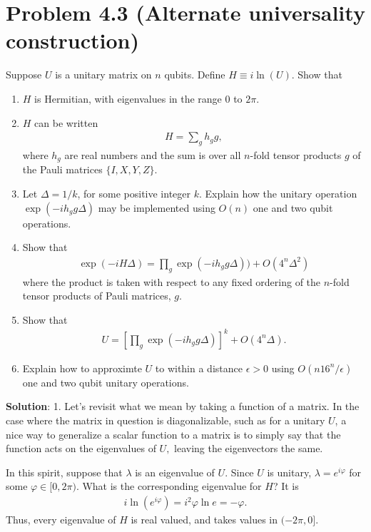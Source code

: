 \documentclass{book}
\begin{document}
\section*{Problem 4.3 (Alternate universality construction)}
    Suppose $U$ is a unitary matrix on $n$ qubits. Define $H \equiv i \ln(U)$. Show that
    \begin{enumerate}
        \item $H$ is Hermitian, with eigenvalues in the range $0$ to $2\pi$.
        \item $H$ can be written
        \begin{align} \label{eq:pauli_sum}
            H = \sum_g h_g g,
        \end{align}
        where $h_g$ are real numbers and the sum is over all $n$-fold tensor products $g$ of the Pauli matrices $\{I, X, Y, Z\}$.
        \item Let $\Delta = 1/k$, for some positive integer $k$. Explain how the unitary operation $\exp(-i h_g g \Delta)$ may be implemented using $O(n)$ one and two qubit operations.
        \item Show that
        \begin{align}
            \exp(-i H \Delta) = \prod_g \exp(-i h_g g \Delta)) + O(4^n \Delta^2)
        \end{align}
        where the product is taken with respect to any fixed ordering of the $n$-fold tensor products of Pauli matrices, $g$.
        \item Show that
        \begin{align}
            U = \left[\prod_g \exp(-i h_g g \Delta)\right]^k + O(4^n \Delta).
        \end{align}
        \item Explain how to approximte $U$ to within a distance $\epsilon >0$ using $O(n16^n/\epsilon)$ one and two qubit unitary operations.
    \end{enumerate}

    \textbf{Solution}: 1. Let's revisit what we mean by taking a function of a matrix. In the case where the matrix in question is diagonalizable, such as for a unitary $U$, a nice way to generalize a scalar function to a matrix is to simply say that the function acts on the eigenvalues of $U,$ leaving the eigenvectors the same. 

    In this spirit, suppose that $\lambda$ is an eigenvalue of $U$. Since $U$ is unitary, $\lambda = e^{i\varphi}$ for some $\varphi \in [0,2\pi)$. What is the corresponding eigenvalue for $H$? It is
    \begin{align}
        i \ln (e^{i\varphi}) = i^2 \varphi \ln e = -\varphi.
    \end{align}
    Thus, every eigenvalue of $H$ is real valued, and takes values in $(-2\pi,0]$.
\end{document}
